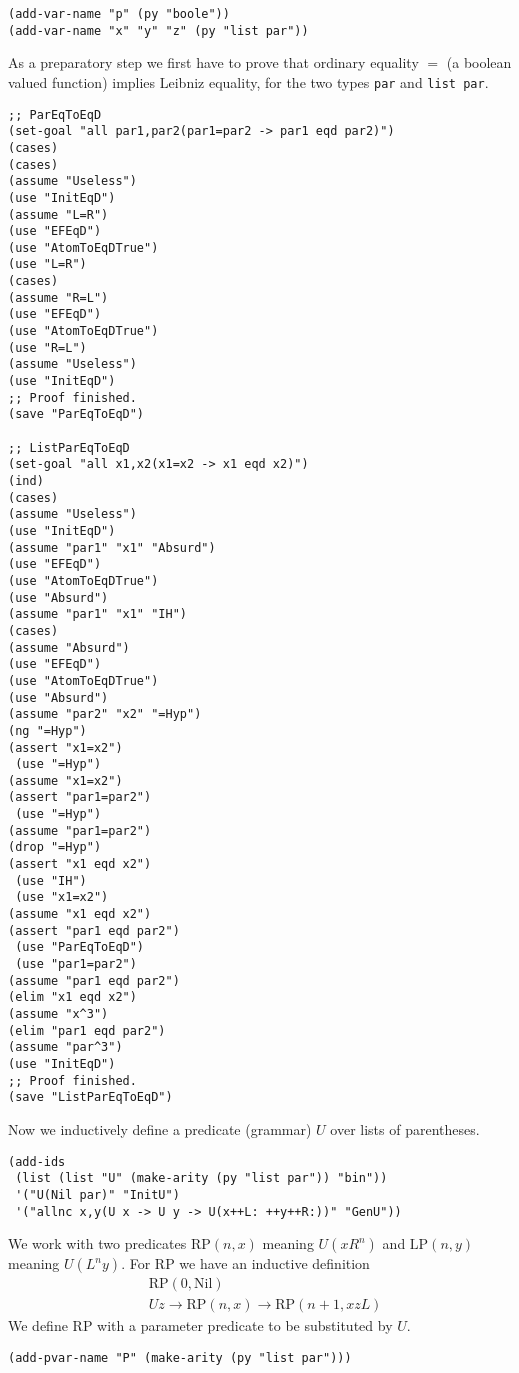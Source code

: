 \documentclass[12pt]{amsart}
\newcommand{\nil}{\mathrm{Nil}}
\begin{document}
\begin{appendix}
\begin{verbatim}
(add-var-name "p" (py "boole"))
(add-var-name "x" "y" "z" (py "list par"))
\end{verbatim}
As a preparatory step we first have to prove that ordinary equality $=$
(a boolean valued function) implies Leibniz equality, for the two types
\texttt{par} and \texttt{list\ par}.
\begin{verbatim}
;; ParEqToEqD
(set-goal "all par1,par2(par1=par2 -> par1 eqd par2)")
(cases)
(cases)
(assume "Useless")
(use "InitEqD")
(assume "L=R")
(use "EFEqD")
(use "AtomToEqDTrue")
(use "L=R")
(cases)
(assume "R=L")
(use "EFEqD")
(use "AtomToEqDTrue")
(use "R=L")
(assume "Useless")
(use "InitEqD")
;; Proof finished.
(save "ParEqToEqD")

;; ListParEqToEqD
(set-goal "all x1,x2(x1=x2 -> x1 eqd x2)")
(ind)
(cases)
(assume "Useless")
(use "InitEqD")
(assume "par1" "x1" "Absurd")
(use "EFEqD")
(use "AtomToEqDTrue")
(use "Absurd")
(assume "par1" "x1" "IH")
(cases)
(assume "Absurd")
(use "EFEqD")
(use "AtomToEqDTrue")
(use "Absurd")
(assume "par2" "x2" "=Hyp")
(ng "=Hyp")
(assert "x1=x2")
 (use "=Hyp")
(assume "x1=x2")
(assert "par1=par2")
 (use "=Hyp")
(assume "par1=par2")
(drop "=Hyp")
(assert "x1 eqd x2")
 (use "IH")
 (use "x1=x2")
(assume "x1 eqd x2")
(assert "par1 eqd par2")
 (use "ParEqToEqD")
 (use "par1=par2")
(assume "par1 eqd par2")
(elim "x1 eqd x2")
(assume "x^3")
(elim "par1 eqd par2")
(assume "par^3")
(use "InitEqD")
;; Proof finished.
(save "ListParEqToEqD")
\end{verbatim}

Now we inductively define a predicate (grammar) $U$ over lists of
parentheses.
\begin{verbatim}
(add-ids
 (list (list "U" (make-arity (py "list par")) "bin"))
 '("U(Nil par)" "InitU")
 '("allnc x,y(U x -> U y -> U(x++L: ++y++R:))" "GenU"))
\end{verbatim}
We work with two predicates $\mathrm{RP}(n,x)$ meaning $U(x R^n)$ and
$\mathrm{LP}(n,y)$ meaning $U(L^n y)$.  For $\mathrm{RP}$ we have an
inductive definition
\begin{align*}
  & \mathrm{RP}(0,\nil)
  \\
  & U z \to \mathrm{RP}(n,x) \to \mathrm{RP}(n+1,xzL)
\end{align*}
We define $\mathrm{RP}$ with a parameter predicate to be substituted
by $U$.
\begin{verbatim}
(add-pvar-name "P" (make-arity (py "list par")))


\end{verbatim}
\end{appendix}
\end{document}
